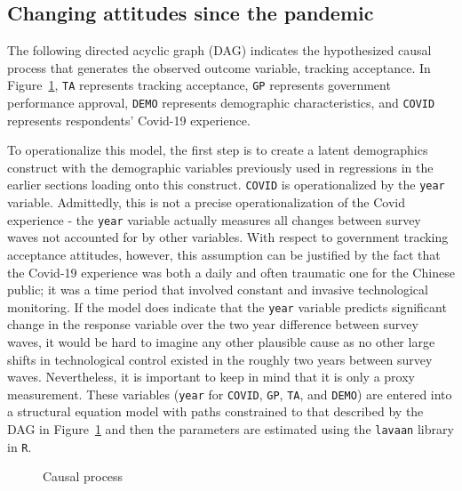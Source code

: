 \documentclass[
  number]{elsarticle}
\begin{document}
\subsection{Changing attitudes since the
pandemic}\label{changing-attitudes-since-the-pandemic}

The following directed acyclic graph (DAG) indicates the hypothesized
causal process that generates the observed outcome variable, tracking
acceptance. In Figure~\ref{fig-dag}, \texttt{TA} represents tracking
acceptance, \texttt{GP} represents government performance approval,
\texttt{DEMO} represents demographic characteristics, and \texttt{COVID}
represents respondents' Covid-19 experience.

To operationalize this model, the first step is to create a latent
demographics construct with the demographic variables previously used in
regressions in the earlier sections loading onto this construct.
\texttt{COVID} is operationalized by the \texttt{year} variable.
Admittedly, this is not a precise operationalization of the Covid
experience - the \texttt{year} variable actually measures all changes
between survey waves not accounted for by other variables. With respect
to government tracking acceptance attitudes, however, this assumption
can be justified by the fact that the Covid-19 experience was both a
daily and often traumatic one for the Chinese public; it was a time
period that involved constant and invasive technological monitoring. If
the model does indicate that the \texttt{year} variable predicts
significant change in the response variable over the two year difference
between survey waves, it would be hard to imagine any other plausible
cause as no other large shifts in technological control existed in the
roughly two years between survey waves. Nevertheless, it is important to
keep in mind that it is only a proxy measurement. These variables
(\texttt{year} for \texttt{COVID}, \texttt{GP}, \texttt{TA}, and
\texttt{DEMO}) are entered into a structural equation model with paths
constrained to that described by the DAG in Figure~\ref{fig-dag} and
then the parameters are estimated using the \texttt{lavaan} library in
\texttt{R}.

\begin{figure}


\caption{\label{fig-dag}Causal process}

\end{figure}%
\end{document}
